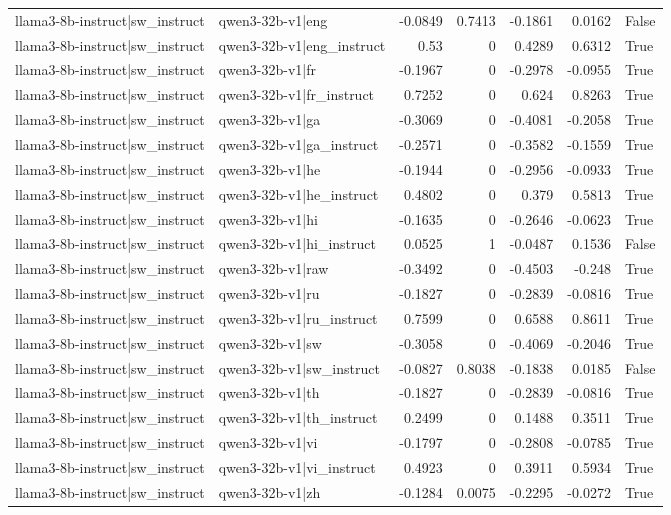 \begin{table}
\begin{tabular}{l l r r r r l}
llama3-8b-instruct|sw_instruct & qwen3-32b-v1|eng & -0.0849 & 0.7413 & -0.1861 & 0.0162 & False \\
llama3-8b-instruct|sw_instruct & qwen3-32b-v1|eng_instruct & 0.53 & 0 & 0.4289 & 0.6312 & True \\
llama3-8b-instruct|sw_instruct & qwen3-32b-v1|fr & -0.1967 & 0 & -0.2978 & -0.0955 & True \\
llama3-8b-instruct|sw_instruct & qwen3-32b-v1|fr_instruct & 0.7252 & 0 & 0.624 & 0.8263 & True \\
llama3-8b-instruct|sw_instruct & qwen3-32b-v1|ga & -0.3069 & 0 & -0.4081 & -0.2058 & True \\
llama3-8b-instruct|sw_instruct & qwen3-32b-v1|ga_instruct & -0.2571 & 0 & -0.3582 & -0.1559 & True \\
llama3-8b-instruct|sw_instruct & qwen3-32b-v1|he & -0.1944 & 0 & -0.2956 & -0.0933 & True \\
llama3-8b-instruct|sw_instruct & qwen3-32b-v1|he_instruct & 0.4802 & 0 & 0.379 & 0.5813 & True \\
llama3-8b-instruct|sw_instruct & qwen3-32b-v1|hi & -0.1635 & 0 & -0.2646 & -0.0623 & True \\
llama3-8b-instruct|sw_instruct & qwen3-32b-v1|hi_instruct & 0.0525 & 1 & -0.0487 & 0.1536 & False \\
llama3-8b-instruct|sw_instruct & qwen3-32b-v1|raw & -0.3492 & 0 & -0.4503 & -0.248 & True \\
llama3-8b-instruct|sw_instruct & qwen3-32b-v1|ru & -0.1827 & 0 & -0.2839 & -0.0816 & True \\
llama3-8b-instruct|sw_instruct & qwen3-32b-v1|ru_instruct & 0.7599 & 0 & 0.6588 & 0.8611 & True \\
llama3-8b-instruct|sw_instruct & qwen3-32b-v1|sw & -0.3058 & 0 & -0.4069 & -0.2046 & True \\
llama3-8b-instruct|sw_instruct & qwen3-32b-v1|sw_instruct & -0.0827 & 0.8038 & -0.1838 & 0.0185 & False \\
llama3-8b-instruct|sw_instruct & qwen3-32b-v1|th & -0.1827 & 0 & -0.2839 & -0.0816 & True \\
llama3-8b-instruct|sw_instruct & qwen3-32b-v1|th_instruct & 0.2499 & 0 & 0.1488 & 0.3511 & True \\
llama3-8b-instruct|sw_instruct & qwen3-32b-v1|vi & -0.1797 & 0 & -0.2808 & -0.0785 & True \\
llama3-8b-instruct|sw_instruct & qwen3-32b-v1|vi_instruct & 0.4923 & 0 & 0.3911 & 0.5934 & True \\
llama3-8b-instruct|sw_instruct & qwen3-32b-v1|zh & -0.1284 & 0.0075 & -0.2295 & -0.0272 & True \\

\end{tabular}
\end{table}
